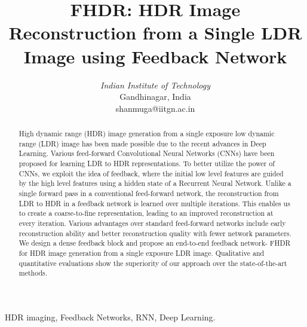 \documentclass[conference]{IEEEtran}
\begin{document}
\title{FHDR: HDR Image Reconstruction from a Single LDR Image using Feedback Network\\
}

\author{
\and
{}
\and
{}
\textit{Indian Institute of Technology}\\
Gandhinagar, India \\
shanmuga@iitgn.ac.in}


\maketitle

\begin{abstract}
High dynamic range (HDR) image generation from a single exposure low dynamic range (LDR) image has been made possible due to the recent advances in Deep Learning. Various feed-forward Convolutional Neural Networks (CNNs) have been proposed for learning LDR to HDR representations. To better utilize the power of CNNs, we exploit the idea of feedback, where the initial low level features are guided by the high level features using a hidden state of a Recurrent Neural Network. 
Unlike a single forward pass in a conventional feed-forward network, the reconstruction from LDR to HDR in a feedback network is learned over multiple iterations. This enables us to create a coarse-to-fine representation, leading to an improved reconstruction at every iteration.
Various advantages over standard feed-forward networks include early reconstruction ability and better reconstruction quality with fewer network parameters. We design a dense feedback block and propose an end-to-end feedback network- FHDR for HDR image generation from a single exposure LDR image. Qualitative and quantitative evaluations show the superiority of our approach over the state-of-the-art methods.

\end{abstract}

\begin{IEEEkeywords}
HDR imaging, Feedback Networks, RNN, Deep Learning.
\end{IEEEkeywords}
\end{document}
